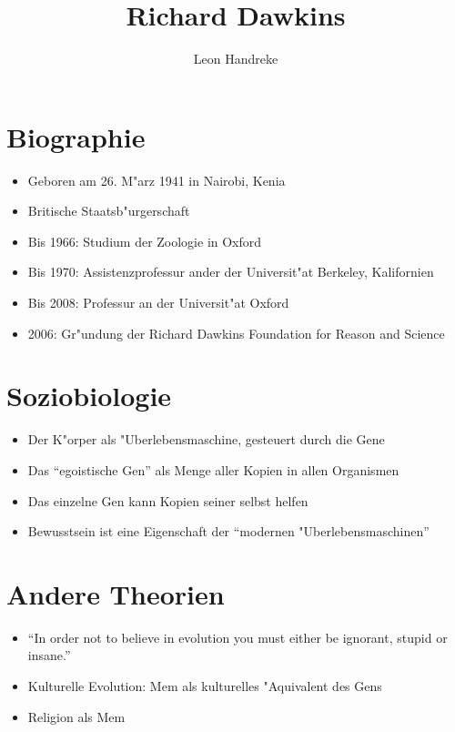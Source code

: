 \documentclass[11pt]{article}
\title{Richard Dawkins}
\author{Leon Handreke}
\date{}                                           %
\begin{document}
\maketitle

\selectfont


\section{Biographie}

\begin{itemize}
\item Geboren am 26. M"arz 1941 in Nairobi, Kenia
\item Britische Staatsb"urgerschaft
\item Bis 1966: Studium der Zoologie in Oxford
\item Bis 1970: Assistenzprofessur ander der Universit"at Berkeley, Kalifornien
\item Bis 2008: Professur an der Universit"at Oxford
\item 2006: Gr"undung der Richard Dawkins Foundation for Reason and Science
\end{itemize}


\section{Soziobiologie}

\begin{itemize}
\item Der K"orper als "Uberlebensmaschine, gesteuert durch die Gene
\item Das ``egoistische Gen'' als Menge aller Kopien in allen Organismen
\item Das einzelne Gen kann Kopien seiner selbst helfen
\item Bewusstsein ist eine Eigenschaft der ``modernen "Uberlebensmaschinen''
\end{itemize}

\section{Andere Theorien}
\begin{itemize}
\item ``In order not to believe in evolution you must either be ignorant, stupid or insane.''
\item Kulturelle Evolution: Mem als kulturelles "Aquivalent des Gens
\item Religion als Mem
\end{itemize}
\end{document}
